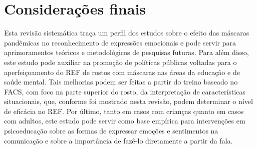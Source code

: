 \documentclass[portuguese]{textolivre}
\begin{document}
\section{Considerações finais}
Esta revisão sistemática traça um perfil dos estudos sobre o efeito das máscaras pandêmicas no reconhecimento de expressões emocionais e pode servir para aprimoramentos teóricos e metodológicos de pesquisas futuras. Para além disso, este estudo pode auxiliar na promoção de políticas públicas voltadas para o aperfeiçoamento do REF de rostos com máscaras nas áreas da educação e de saúde mental. Tais melhorias podem ser feitas a partir do treino baseado no FACS, com foco na parte superior do rosto, da interpretação de características situacionais, que, conforme foi mostrado nesta revisão, podem determinar o nível de eficácia no REF. Por último, tanto em casos com crianças quanto em casos com adultos, este estudo pode servir como base empírica para intervenções em psicoeducação sobre as formas de expressar emoções e sentimentos na comunicação e sobre a importância de fazê-lo diretamente a partir da fala.
\end{document}
